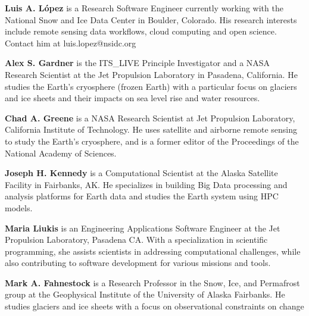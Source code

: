 \documentclass[
  super,
  preprint,
  3p,
  twocolumn]{elsarticle}
\begin{document}
\textbf{Luis A. López} is a Research Software Engineer currently working
with the National Snow and Ice Data Center in Boulder, Colorado. His
research interests include remote sensing data workflows, cloud
computing and open science. Contact him at luis.lopez@nsidc.org

\textbf{Alex S. Gardner} is the ITS\_LIVE Principle Investigator and a
NASA Research Scientist at the Jet Propulsion Laboratory in Pasadena,
California. He studies the Earth's cryosphere (frozen Earth) with a
particular focus on glaciers and ice sheets and their impacts on sea
level rise and water resources.

\textbf{Chad A. Greene} is a NASA Research Scientist at Jet Propulsion
Laboratory, California Institute of Technology. He uses satellite and
airborne remote sensing to study the Earth's cryosphere, and is a former
editor of the Proceedings of the National Academy of Sciences.

\textbf{Joseph H. Kennedy} is a Computational Scientist at the Alaska
Satellite Facility in Fairbanks, AK. He specializes in building Big Data
processing and analysis platforms for Earth data and studies the Earth
system using HPC models.

\textbf{Maria Liukis} is an Engineering Applications Software Engineer
at the Jet Propulsion Laboratory, Pasadena CA. With a specialization in
scientific programming, she assists scientists in addressing
computational challenges, while also contributing to software
development for various missions and tools.

\textbf{Mark A. Fahnestock} is a Research Professor in the Snow, Ice,
and Permafrost group at the Geophysical Institute of the University of
Alaska Fairbanks. He studies glaciers and ice sheets with a focus on
observational constraints on change


\renewcommand\refname{References}
  
\end{document}
